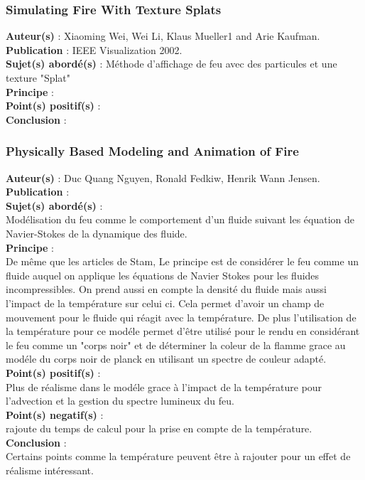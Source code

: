 \documentclass[a4paper,10pt]{article}
\begin{document}
\subsubsection{Simulating Fire With Texture Splats}
\textbf{Auteur(s)} : Xiaoming Wei, Wei Li, Klaus Mueller1 and Arie Kaufman.\\
\textbf{Publication} : IEEE Visualization 2002. \\
\textbf{Sujet(s) abordé(s)} : Méthode d'affichage de feu avec des particules et une texture "Splat"\\ 
\textbf{Principe} :\\	
\textbf{Point(s) positif(s)} :\\
\textbf{Conclusion} :\\


\subsubsection{Physically Based Modeling and Animation of Fire}
\textbf{Auteur(s)} : Duc Quang Nguyen, Ronald Fedkiw, Henrik Wann Jensen.\\
\textbf{Publication} :  \\
\textbf{Sujet(s) abordé(s)} : \\ 
	Modélisation du feu comme le comportement d'un fluide suivant les équation de Navier-Stokes de la dynamique des fluide.\\
\textbf{Principe} :\\	
	De même que les articles de Stam, Le principe est de considérer le feu comme un fluide auquel on applique les équations de Navier Stokes  pour les fluides incompressibles. On prend aussi en compte la densité du fluide mais aussi l'impact de la température sur celui ci. Cela permet d'avoir un champ de mouvement pour le fluide qui réagit avec la température. De plus l'utilisation de la température pour ce modéle permet d'être utilisé pour le rendu en considérant le feu comme un "corps noir" et de déterminer la coleur de la flamme grace au modéle du corps noir de planck en utilisant un spectre de couleur adapté.\\
\textbf{Point(s) positif(s)} :\\
	Plus de réalisme dans le modéle grace à l'impact de la température pour l'advection et la gestion du spectre lumineux du feu.\\	
\textbf{Point(s) negatif(s)} :\\
	rajoute du temps de calcul pour la prise en compte de la température.\\
\textbf{Conclusion} :\\
	Certains points comme la température peuvent être à rajouter pour un effet de réalisme intéressant.\\
\end{document}
